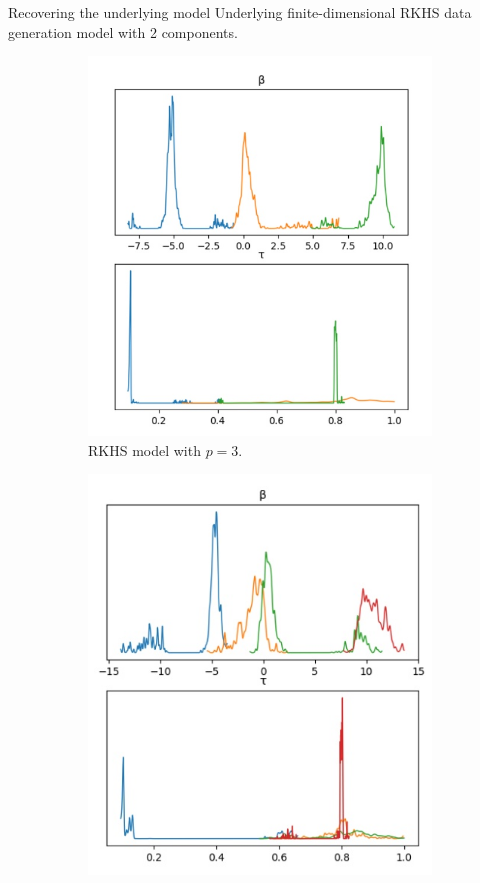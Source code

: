 \documentclass[9pt, english, professionalfonts]{beamer}
\begin{document}
\begin{frame}{Recovering the underlying model}
  \vspace{1em}
  Underlying finite-dimensional RKHS data generation model with 2 components.

  \vspace{.5em}
\begin{figure}[b]

  \begin{subfigure}[b]{0.48\textwidth}
    \includegraphics[width=.95\textwidth]{beta_3}
    \caption{RKHS model with \(p=3\).}
  \end{subfigure}
  \hfill
  \begin{subfigure}[b]{0.48\textwidth}
    \includegraphics[width=.9\textwidth]{beta_4}

\end{subfigure}
\end{figure}
\end{frame}
\end{document}
